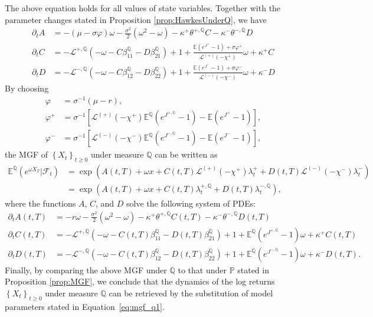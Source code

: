 \documentclass[11pt,a4paper]{article}
\numberwithin{equation}{section}
\theoremstyle{remark}
\theoremstyle{definition}
\newcommand{\E}{{\mathbb{E}}}
\newcommand{\q}{{\mathbb Q}}
\begin{document}
The above equation holds for all values of state variables. Together with the parameter changes stated in Proposition \ref{prop:HawkesUnderQ}, we have
\begin{align*}
    \partial_t A &= -(\mu - \sigma\varphi)\omega - \frac{\sigma^2}{2}(\omega^2-\omega)-\kappa^+\theta^{+,\mathbb{Q}}C-\kappa^-\theta^{-,\mathbb{Q}}D\\
    \partial_t C &= -\mathcal{L}^{+, \mathbb{Q}}(-\omega-C\beta^\mathbb{Q}_{11}-D\beta^\mathbb{Q}_{21})+1
    +\frac{\E\left(e^{J^+}-1\right)+\sigma \varphi^+}{\mathcal{L}^{(+)}(-\chi^+)}\omega+\kappa^+C\\
    \partial_t D &= -\mathcal{L}^{-, \mathbb{Q}}(-\omega-C\beta^\mathbb{Q}_{12}-D\beta^\mathbb{Q}_{22})+1
    +\frac{\E\left(e^{J^-}-1\right)+\sigma \varphi^-}{\mathcal{L}^{(-)}(-\chi^-)}\omega+\kappa^-D
\end{align*}
By choosing
\begin{align*}
  \varphi   &= \sigma^{-1}(\mu-r),\\
  \varphi^+ &= \sigma^{-1}\left[\mathcal{L}^{(+)}(-\chi^+) \E^\mathbb{Q}\left(e^{J^{+,\q}}-1\right)-\E\left(e^{J^+}-1\right)\right],\\
  \varphi^- &= \sigma^{-1}\left[\mathcal{L}^{(-)}(-\chi^-) \E^\mathbb{Q}\left(e^{J^{-,\q}}-1\right)-\E\left(e^{J^-}-1\right)\right],
\end{align*}
 the MGF of $\left\{X_t\right\}_{t \geq 0}$ under measure $\mathbb{Q}$ can be written as
\begin{align*}
    \E^\mathbb{Q}\left(e^{\omega X_T}\big|\mathcal{F}_t\right)
    &= \exp\left(A(t,T)+\omega x + C(t,T)\mathcal{L}^{(+)}(-\chi^+)\lambda^{+}_t  + D(t,T)\mathcal{L}^{(-)}(-\chi^-)\lambda^{-}_t\right)\\
    &= \exp\left(A(t,T)+\omega x + C(t,T)\lambda^{+, \mathbb{Q}}_t +D(t,T)\lambda^{-, \mathbb{Q}}_t \right),
\end{align*}
where the functions $A$, $C$, and $D$ solve the following system of PDEs:
\begin{align*}
    \partial_t A(t,T) &= -r\omega - \frac{\sigma^2}{2}(\omega^2-\omega)-\kappa^+\theta^{+,\mathbb{Q}}C(t,T)-\kappa^-\theta^{-,\mathbb{Q}}D(t,T)\\
    \partial_t C(t,T) &= -\mathcal{L}^{+, \mathbb{Q}}(-\omega-C(t,T)\beta^\mathbb{Q}_{11}-D(t,T)\beta^\mathbb{Q}_{21})+1
    + \E^\mathbb{Q}\left(e^{J^{+,\q}}-1\right)\omega+\kappa^+C(t,T)\\
    \partial_t D(t,T) &= -\mathcal{L}^{-, \mathbb{Q}}(-\omega-C(t,T)\beta^\mathbb{Q}_{12}-D(t,T)\beta^\mathbb{Q}_{22})+1
    + \E^\mathbb{Q}\left(e^{J^{-,\q}}-1\right)\omega+\kappa^-D(t,T).
\end{align*}
 Finally, by comparing the above MGF under $\mathbb{Q}$ to that under $\mathbb{P}$ stated in Proposition \ref{prop:MGF}, we conclude that the dynamics of the log returns $\left\{X_t\right\}_{t \geq 0}$ under measure $\mathbb{Q}$ can be retrieved by the substitution of model parameters stated in Equation~\eqref{eq:mgf_q1}.
\end{document}

